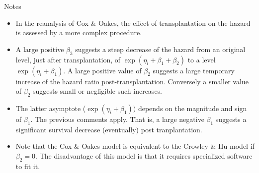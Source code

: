 \documentclass[envcountsect, 10pt, portrait, palatino]{beamer}
\begin{document}
\begin{frame}{Notes}
\begin{itemize}
\item
In the reanalysis of Cox \& Oakes, the effect of transplantation on the hazard is assessed by a more complex procedure.
\item A large positive $\beta_3$ suggests a steep decrease of the hazard from an original level, just after transplantation, of $\exp(\eta_i+\beta_1+\beta_2)$ to a level $\exp(\eta_i+\beta_1)$.  A large positive value of $\beta_2$ suggests a large temporary increase of the hazard ratio post-transplantation.  Conversely a smaller value of $\beta_2$ suggests small or negligible such increases.
\item
The latter asymptote ($\exp(\eta_i+\beta_1))$ depends on the magnitude and sign of $\beta_1$.  The previous comments apply. That is, a large negative $\beta_1$ suggests a significant survival decrease (eventually) post tranplantation. \item
Note that the Cox \& Oakes model is equivalent to the Crowley \& Hu model if $\beta_2=0$.  The disadvantage of this model is that it requires specialized software to fit it.
\end{itemize}
\normalsize
\end{frame} 
\end{document}

